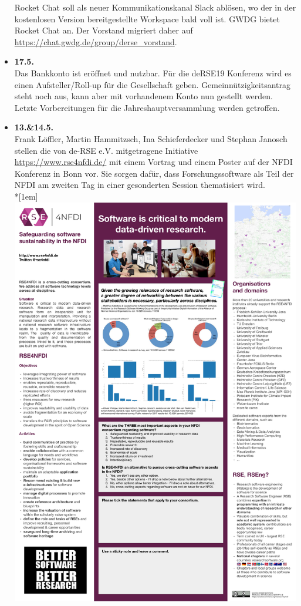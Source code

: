 \begin{itemize}
  Rocket Chat soll als neuer Kommunikationskanal Slack ablösen, wo der in
  der kostenlosen Version bereitgestellte Workspace bald voll ist. GWDG
  bietet Rocket Chat an. Der Vorstand migriert daher auf
  \href{https://chat.gwdg.de/group/derse_vorstand}{https://chat.gwdg.de/group/derse\_vorstand}.
 \item \textbf{17.5.}\\
  Das Bankkonto ist eröffnet und nutzbar.
  Für die deRSE19 Konferenz wird es einen Aufsteller/Roll-up für die Gesellschaft geben.
  Gemeinnützigkeitsantrag steht noch aus, kann aber mit vorhandenem Konto nun gestellt werden.
  Letzte Vorbereitungen für die Jahreshauptversammlung werden getroffen.
 \item \textbf{13.\&14.5.}\\
  Frank Löffler, Martin Hammitzsch, Ina Schieferdecker und Stephan Janosch stellen die von de-RSE e.V. mitgetragene Initiative\\\href{RSE4NFDI}{https://www.rse4nfdi.de/} mit einem Vortrag und einem Poster auf der NFDI Konferenz in Bonn vor. Sie sorgen dafür, dass Forschungssoftware als Teil der NFDI am zweiten Tag in einer gesonderten Session thematisiert wird.\\*[1em]
  \includegraphics[width=\textwidth]{RSE4NFDI_Poster}\\

\end{itemize}
